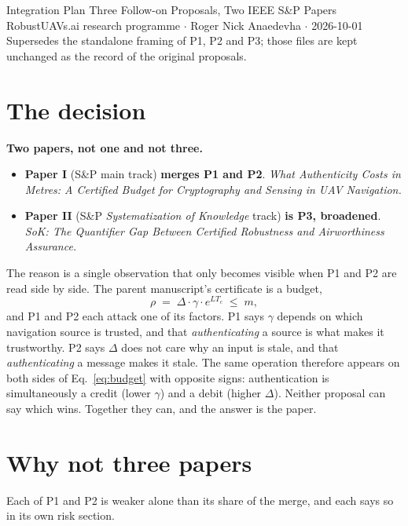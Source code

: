 \documentclass[11pt,a4paper]{article}
\begin{document}
\proposalheader
  {Integration Plan}
  {Three Follow-on Proposals, Two IEEE S\&P Papers}
  {RobustUAVs.ai research programme $\cdot$ Roger Nick Anaedevha $\cdot$
   2026-10-01\\
   Supersedes the standalone framing of P1, P2 and P3; those files are kept
   unchanged as the record of the original proposals.}

\section{The decision}
\textbf{Two papers, not one and not three.}

\begin{itemize}
\item \textbf{Paper I} (S\&P main track) \textbf{merges P1 and P2}.
  \emph{What Authenticity Costs in Metres: A Certified Budget for Cryptography
  and Sensing in UAV Navigation.}
\item \textbf{Paper II} (S\&P \emph{Systematization of Knowledge} track)
  \textbf{is P3, broadened}.
  \emph{SoK: The Quantifier Gap Between Certified Robustness and Airworthiness
  Assurance.}
\end{itemize}

\noindent
The reason is a single observation that only becomes visible when P1 and P2 are
read side by side. The parent manuscript's certificate is a budget,
\begin{equation}
\label{eq:budget}
\rho \;=\; \Delta \cdot \gamma \cdot e^{L T_c} \;\le\; m ,
\end{equation}
and P1 and P2 each attack one of its factors. P1 says $\gamma$ depends on which
navigation source is trusted, and that \emph{authenticating} a source is what
makes it trustworthy. P2 says $\Delta$ does not care why an input is stale, and
that \emph{authenticating} a message makes it stale. The same operation
therefore appears on both sides of Eq.~\eqref{eq:budget} with opposite signs:
authentication is simultaneously a credit (lower $\gamma$) and a debit (higher
$\Delta$). Neither proposal can say which wins. Together they can, and the
answer is the paper.

\section{Why not three papers}
Each of P1 and P2 is weaker alone than its share of the merge, and each says so
in its own risk section.
\end{document}

